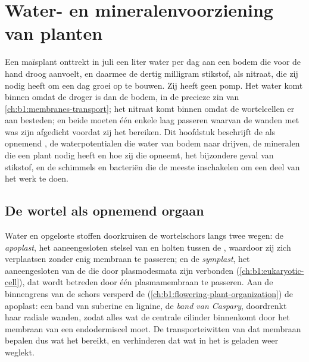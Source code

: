 \chapter{Water- en mineralenvoorziening van planten}\label{ch:b1:plant-water-minerals}

Een maïsplant onttrekt in juli een liter water per dag aan een bodem die
voor de hand droog aanvoelt, en daarmee de dertig milligram stikstof, als
nitraat, die zij nodig heeft om een dag groei op te bouwen. Zij heeft geen
pomp. Het water komt binnen omdat de  droger is dan de bodem, in de
precieze zin van \cref{ch:b1:membranes-transport}; het nitraat komt binnen
omdat de wortelcellen er  aan besteden; en beide moeten één enkele laag
 passeren waarvan de wanden met was zijn afgedicht voordat zij het
 bereiken. Dit hoofdstuk beschrijft de  als opnemend , de
waterpotentialen die water van bodem naar  drijven, de mineralen die
een plant nodig heeft en hoe zij die opneemt, het bijzondere geval van
stikstof, en de schimmels en bacteriën die de meeste  inschakelen om
een deel van het werk te doen.

\section{De wortel als opnemend orgaan}

\begin{definition}\label{def:b1:plant-water-minerals:pathways}
Water en opgeloste stoffen doorkruisen de wortelschors langs twee wegen: de
\emph{apoplast}, het aaneengesloten stelsel van  en holten tussen
de , waardoor zij zich verplaatsen zonder enig membraan te passeren;
en de \emph{symplast}, het aaneengesloten  van de  die door
plasmodesmata zijn verbonden (\cref{ch:b1:eukaryotic-cell}), dat wordt
betreden door één plasmamembraan te passeren. Aan de binnengrens van de
schors versperd de \emph{}
(\cref{ch:b1:flowering-plant-organization}) de apoplast: een band van
suberine en lignine, de \emph{band van Caspary}, doordrenkt haar radiale
wanden, zodat alles wat de centrale cilinder binnenkomt door het membraan
van een endodermiscel moet. De transporteiwitten van dat membraan bepalen
dus wat het  bereikt, en verhinderen dat wat in het  is geladen
weer weglekt.
\end{definition}

